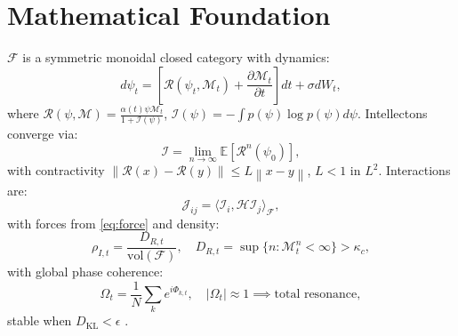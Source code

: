\documentclass[11pt]{article}
\newcommand{\field}[1]{\mathcal{#1}}
\newcommand{\intellecton}{\mathcal{I}}
\newcommand{\expect}{\mathbb{E}}
\newcommand{\norm}[1]{\left\| #1 \right\|}
\newcommand{\inner}[2]{\langle #1, #2 \rangle}
\newcommand{\dkl}{D_{\text{KL}}}
\begin{document}
\section{Mathematical Foundation}
\label{sec:math}
$\field{F}$ is a symmetric monoidal closed category with dynamics:
\begin{equation}
d\psi_t = \left[ \mathcal{R}(\psi_t, \mathcal{M}_t) + \frac{\partial \mathcal{M}_t}{\partial t} \right] dt + \sigma dW_t,
\label{eq:field}
\end{equation}
where $\mathcal{R}(\psi, \mathcal{M}) = \frac{\alpha(t) \psi \mathcal{M}_t}{1 + \mathcal{I}(\psi)}$, $\mathcal{I}(\psi) = -\int p(\psi) \log p(\psi) d\psi$. Intellectons converge via:
\begin{equation}
\intellecton = \lim_{n \to \infty} \expect[\mathcal{R}^n(\psi_0)],
\label{eq:intellecton}
\end{equation}
with contractivity $\norm{\mathcal{R}(x) - \mathcal{R}(y)} \leq L \norm{x - y}$, $L < 1$ in $L^2$. Interactions are:
\begin{equation}
\mathcal{J}_{ij} = \inner{\intellecton_i}{\mathcal{H} \intellecton_j}_{\field{F}},
\label{eq:interaction}
\end{equation}
with forces from \eqref{eq:force} and density:
\begin{equation}
\rho_{I,t} = \frac{D_{R,t}}{\text{vol}(\field{F})}, \quad D_{R,t} = \sup \{ n : \mathcal{M}^n_t < \infty \} > \kappa_c,
\label{eq:density}
\end{equation}
with global phase coherence:
\begin{equation}
\Omega_t = \frac{1}{N} \sum_k e^{i \Phi_{k,t}}, \quad |\Omega_t| \approx 1 \implies \text{total resonance},
\label{eq:phase}
\end{equation}
stable when $\dkl < \epsilon$ \citep{couzin2023}.
\end{document}
